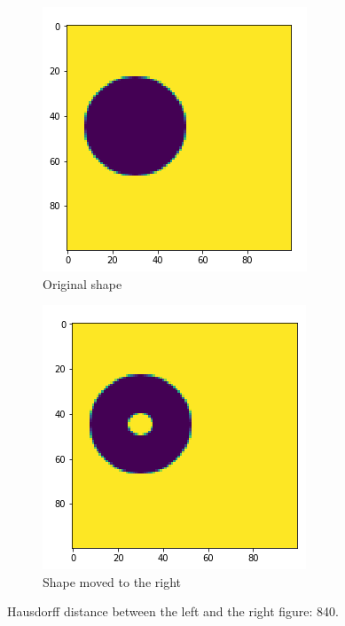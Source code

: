 \begin{figure}[H]
    \centering
    \begin{subfigure}{.5\textwidth}
        \centering
        \includegraphics[width=.75\linewidth]{chapters/06_hdm/images/hdm_original.png}
        \caption{Original shape}
    \end{subfigure}%
    \begin{subfigure}{.5\textwidth}
        \centering
        \includegraphics[width=.75\linewidth]{chapters/06_hdm/images/hdm_hole.png}
        \caption{Shape moved to the right}
    \end{subfigure}
    \caption{Hausdorff distance between the left and the right figure: 840. }
    \label{hdm_hole}
\end{figure}

